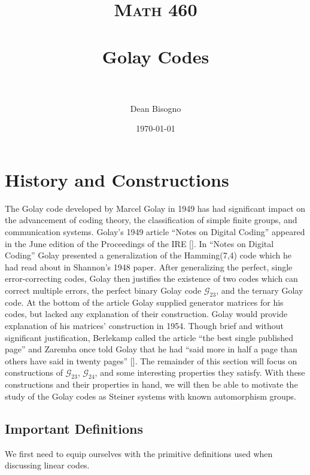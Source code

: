 \documentclass[paper=a4, fontsize=11pt]{scrartcl} %
\title{	
\normalfont \normalsize 
\textsc{Math 460} \\ [25pt] %
\horrule{0.5pt} \\[0.4cm] %
\huge Golay Codes\\ %
\horrule{2pt} \\[0.5cm] %
}
\author{Dean Bisogno} %
\date{\normalsize\today} %
\numberwithin{equation}{section} %
\numberwithin{figure}{section} %
\numberwithin{table}{section} %
\begin{document}
\maketitle %

\section{History and Constructions}

The Golay code developed by Marcel Golay in 1949 has had significant impact on the advancement of coding theory, the classification of simple finite groups, and communication systems. Golay's 1949 article ``Notes on Digital Coding'' appeared in the June edition of the Proceedings of the IRE [\cite{golay}]. In ``Notes on Digital Coding'' Golay presented a generalization of the Hamming(7,4) code which he had read about in Shannon's 1948 paper. After generalizing the perfect, single error-correcting codes, Golay then justifies the existence of two codes which can correct multiple errors, the perfect binary Golay code $\mathcal{G}_{23}$, and the ternary Golay code. At the bottom of the article Golay supplied generator matrices for his codes, but lacked any explanation of their construction. Golay would provide explanation of his matrices' construction in 1954. Though brief and without significant justification, Berlekamp called the article ``the best single published page'' and Zaremba once told Golay that he had ``said more in half a page than others have said in twenty pages'' [\cite{thompson}]. The remainder of this section will focus on constructions of $\mathcal{G}_{23}$, $\mathcal{G}_{24}$, and some interesting properties they satisfy. With these constructions and their properties in hand, we will then be able to motivate the study of the Golay codes as Steiner systems with known automorphism groups.

\subsection{Important Definitions}
We first need to equip ourselves with the primitive definitions used when discussing linear codes.
\end{document}
